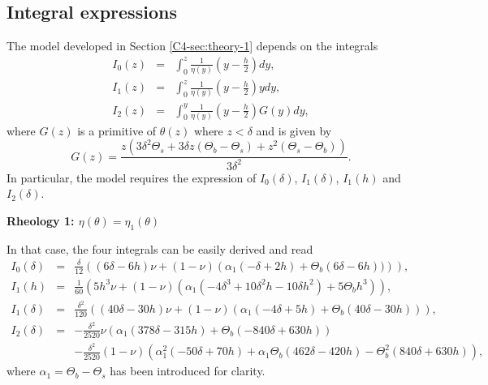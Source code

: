 \subsection{Integral expressions}
\label{sec:integral-expressions}

The model  developed in  Section \ref{C4-sec:theory-1} depends  on the
integrals
\begin{eqnarray}
  I_0(z)&=&\int_0^z\frac{1}{\eta(y)}\left(y-\frac{h}{2}\right)
            dy, \\
  I_1(z) &=& \int_0^z\frac{1}{\eta(y)}\left(y-\frac{h}{2}\right)y dy,\\
  I_2(z)&=&\int_0^y                         \frac{1}{\eta(y)}
            \left(y-\frac{h}{2}\right)G(y)dy,
\end{eqnarray}
where $G(z)$  is a  primitive of $\theta(z)$  where $z<\delta$  and is
given by
\begin{equation}
  G(z) = \frac{z \left(3 \delta ^2 \Theta_s+3 \delta z (\Theta_b-\Theta_s)+z^2 (\Theta_s-\Theta_b)\right)}{3 \delta ^2}.
\end{equation}
In  particular, the  model requires  the expression  of $I_0(\delta)$,
$I_1(\delta)$, $I_1(h)$ and $I_2(\delta)$.

\vspace{.5cm}   \textbf{Rheology   1:   $\eta(\theta)=\eta_1(\theta)$}
\vspace{.5cm}

In that case, the four integrals can be easily derived and read
\begin{eqnarray}
  I_0(\delta)&=&\frac{\delta}{12} \left(\left(6 \delta-6h\right) \nu +
                 (1-\nu) \left(\alpha_1\left(-  \delta + 2  h\right) +
                 \Theta_{b}\left(         6\delta          -         6
                 h\right))\right)\right),\nonumber\\
  I_1(h)&=&\frac{1}{60} \left(5 h^{3} \nu +(1-\nu) \left(\alpha_1\left(- 4  \delta^{3} + 10 \delta^{2} h - 10 \delta h^{2}\right) + 5 \Theta_{b} h^{3}\right) \right)\nonumber,\\
  I_1(\delta)&=&\frac{\delta^{2}}{120} \left(\left(40 \delta-30h\right) \nu + (1-\nu) \left(\alpha_1\left(- 4  \delta + 5 h\right) + \Theta_{b}\left(40  \delta - 30  h\right)\right) \right)\nonumber,\\
  I_2(\delta)&=&- \frac{\delta^{2}}{2520} \nu\left(\alpha_1\left(378   \delta  -
                 315 h\right) + \Theta_{b}\left(-  840  \delta  + 630
                 h\right) \right)\nonumber\\
             &&-\frac{\delta^{2}}{2520}(1-\nu)  \left(\alpha_1^{2}\left(- 50   \delta  + 70
                h\right)  +   \alpha_1\Theta_{b}\left(462      \delta  -  420 
                h\right) -  \Theta_{b}^{2}\left(840   \delta  + 630  
                h\right)\right),\nonumber
\end{eqnarray}
where $\alpha_1=\Theta_b-\Theta_s$ has been introduced for clarity.

